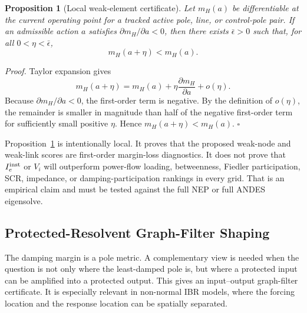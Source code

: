 \documentclass[journal]{IEEEtran}
\newtheorem{proposition}{Proposition}
\begin{document}
\begin{proposition}[Local weak-element certificate]
\label{prop:localweakelement}
Let $m_H(a)$ be differentiable at the current operating point for a tracked active pole, line, or control-pole pair. If an admissible action $a$ satisfies $\partial m_H/\partial a<0$, then there exists $\bar\epsilon>0$ such that, for all $0<\eta<\bar\epsilon$,
\begin{equation}
m_H(a+\eta)<m_H(a).
\end{equation}
\end{proposition}
\noindent\emph{Proof.}
Taylor expansion gives
\begin{equation}
m_H(a+\eta)
=m_H(a)+\eta\frac{\partial m_H}{\partial a}+o(\eta).
\end{equation}
Because $\partial m_H/\partial a<0$, the first-order term is negative. By the definition of $o(\eta)$, the remainder is smaller in magnitude than half of the negative first-order term for sufficiently small positive $\eta$. Hence $m_H(a+\eta)<m_H(a)$. \hfill$\square$

Proposition~\ref{prop:localweakelement} is intentionally local. It proves that the proposed weak-node and weak-link scores are first-order margin-loss diagnostics. It does not prove that $I_e^{\rm inst}$ or $V_i$ will outperform power-flow loading, betweenness, Fiedler participation, SCR, impedance, or damping-participation rankings in every grid. That is an empirical claim and must be tested against the full NEP or full ANDES eigensolve.

\subsection{Protected-Resolvent Graph-Filter Shaping}

The damping margin is a pole metric. A complementary view is needed when the question is not only where the least-damped pole is, but where a protected input can be amplified into a protected output. This gives an input--output graph-filter certificate. It is especially relevant in non-normal IBR models, where the forcing location and the response location can be spatially separated.
\end{document}
